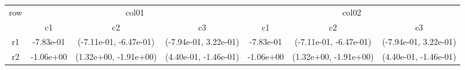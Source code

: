 \begin{tabular}{ccccccc}
\toprule
\multirow{2}{*}{row}&\multicolumn{3}{c}{col01}&\multicolumn{3}{c}{col02}\tabularnewline
\cmidrule(lr){2-4}
\cmidrule(lr){5-7}
&c1&c2&c3&c1&c2&c3\tabularnewline
\midrule
r1&-7.83e-01& (-7.11e-01, -6.47e-01)& (-7.94e-01, 3.22e-01)&-7.83e-01& (-7.11e-01, -6.47e-01)& (-7.94e-01, 3.22e-01)\tabularnewline
r2&-1.06e+00& (1.32e+00, -1.91e+00)& (4.40e-01, -1.46e-01)&-1.06e+00& (1.32e+00, -1.91e+00)& (4.40e-01, -1.46e-01)\tabularnewline
\bottomrule
\end{tabular}
